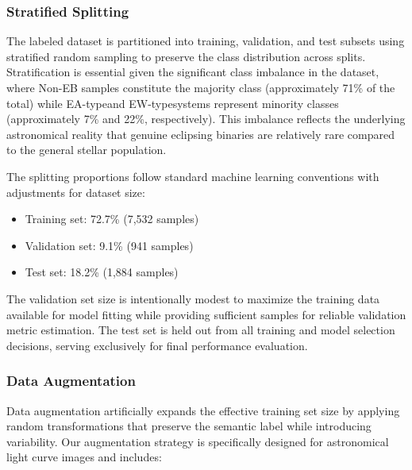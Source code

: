 \documentclass[11pt,a4paper]{article}
\newcommand{\EA}{EA-type}
\newcommand{\EW}{EW-type}
\begin{document}
\subsubsection{Stratified Splitting}

The labeled dataset is partitioned into training, validation, and test subsets using stratified random sampling to preserve the class distribution across splits. Stratification is essential given the significant class imbalance in the dataset, where Non-EB samples constitute the majority class (approximately 71\% of the total) while \EA and \EW systems represent minority classes (approximately 7\% and 22\%, respectively). This imbalance reflects the underlying astronomical reality that genuine eclipsing binaries are relatively rare compared to the general stellar population.

The splitting proportions follow standard machine learning conventions with adjustments for dataset size:
\begin{itemize}
    \item Training set: 72.7\% (7,532 samples)
    \item Validation set: 9.1\% (941 samples)
    \item Test set: 18.2\% (1,884 samples)
\end{itemize}

The validation set size is intentionally modest to maximize the training data available for model fitting while providing sufficient samples for reliable validation metric estimation. The test set is held out from all training and model selection decisions, serving exclusively for final performance evaluation.

\subsubsection{Data Augmentation}

Data augmentation artificially expands the effective training set size by applying random transformations that preserve the semantic label while introducing variability. Our augmentation strategy is specifically designed for astronomical light curve images and includes:
\end{document}
